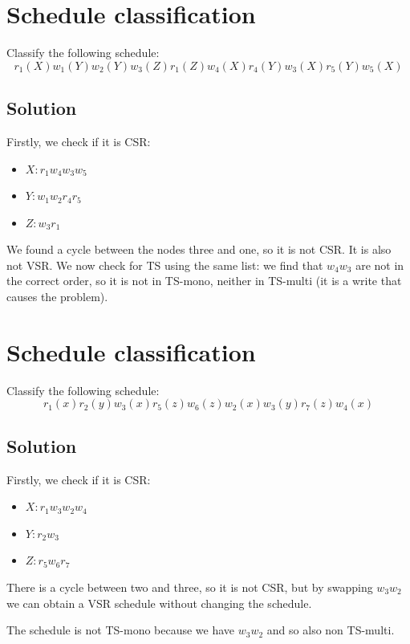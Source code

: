 \documentclass[12pt, a4paper]{report}
\newtheorem[style=M,bodystyle=\normalfont]{theorem}{Theorem}
\newtheorem[style=M,bodystyle=\normalfont]{corollary}{Corollary}
\newtheorem[style=M,bodystyle=\normalfont]{lemma}{Lemma}
\newtheorem[style=M,bodystyle=\normalfont]{definition}{Definition}
\begin{document}
    \newpage

    \section{Schedule classification}
        Classify the following schedule:
        \[r_1(X) w_1(Y) w_2(Y) w_3(Z) r_1(Z) w_4(X) r_4(Y) w_3(X) r_5(Y) w_5(X)\] 
    \subsection*{Solution}
        Firstly, we check if it is CSR:
        \begin{itemize}
            \item $X: r_1 w_4 w_3 w_5$
            \item $Y: w_1 w_2 r_4 r_5$
            \item $Z: w_3 r_1$
        \end{itemize}
        We found a cycle between the nodes three and one, so it is not CSR. It is also not VSR. We now check for TS using the same list: 
        we find that $w_4 w_3$ are not in the correct order, so it is not in TS-mono, neither in TS-multi (it is a write that causes the 
        problem).

    \newpage

    \section{Schedule classification}
        Classify the following schedule:
        \[r_1(x) r_2(y) w_3(x) r_5(z) w_6(z) w_2(x) w_3(y) r_7(z) w_4(x)\] 
    \subsection*{Solution}
        Firstly, we check if it is CSR:
        \begin{itemize}
            \item $X: r_1 w_3 w_2 w_4$
            \item $Y: r_2 w_3$
            \item $Z: r_5 w_6 r_7$
        \end{itemize}
        There is a cycle between two and three, so it is not CSR, but by swapping $w_3 w_2$ we can obtain a VSR schedule without changing the 
        schedule. 

        The schedule is not TS-mono because we have $w_3 w_2$ and so also non TS-multi. 
   
    \newpage 
\end{document}
